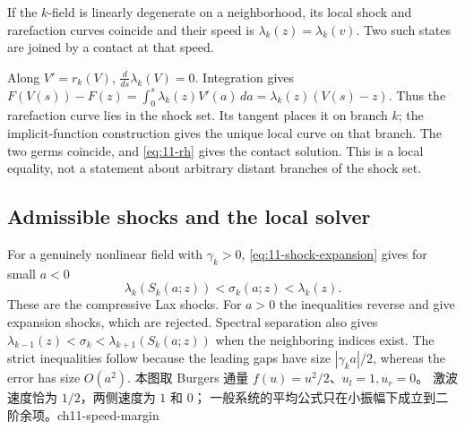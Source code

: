 \begin{theorem}
If the $k$-field is linearly degenerate on a neighborhood, its local
shock and rarefaction curves coincide and their speed is
$\lambda_k(z)=\lambda_k(v)$. Two such states are joined by a contact
at that speed.
\end{theorem}
\begin{expandedproof}
Along $V'=r_k(V)$, $\frac d{ds}\lambda_k(V)=0$.
Integration gives
$F(V(s))-F(z)=\int_0^s\lambda_k(z)V'(a)\,da
=\lambda_k(z)(V(s)-z)$.
Thus the rarefaction curve lies in the shock set. Its tangent places
it on branch $k$; the implicit-function construction gives the unique
local curve on that branch. The two germs coincide, and
\eqref{eq:11-rh} gives the contact solution. This is a local equality,
not a statement about arbitrary distant branches of the shock set.
\end{expandedproof}

\subsection{Admissible shocks and the local solver}
For a genuinely nonlinear field with $\gamma_k>0$, \eqref{eq:11-shock-expansion}
gives for small $a<0$
\[
 \lambda_k(S_k(a;z))<\sigma_k(a;z)<\lambda_k(z).
\]
These are the compressive Lax shocks. For $a>0$ the inequalities
reverse and give expansion shocks, which are rejected. Spectral
separation also gives
$\lambda_{k-1}(z)<\sigma_k<\lambda_{k+1}(S_k(a;z))$
when the neighboring indices exist. The strict inequalities follow
because the leading gaps have size $|\gamma_k a|/2$, whereas the
error has size $O(a^2)$.
{本图取 Burgers 通量 $f(u)=u^2/2$、$u_l=1,u_r=0$。
激波速度恰为 $1/2$，两侧速度为 $1$ 和 $0$；
一般系统的平均公式只在小振幅下成立到二阶余项。}{ch11-speed-margin}

